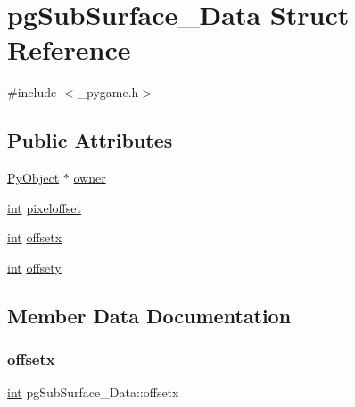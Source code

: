 \hypertarget{structpg_sub_surface___data}{}\section{pg\+Sub\+Surface\+\_\+\+Data Struct Reference}
\label{structpg_sub_surface___data}


{\ttfamily \#include $<$\+\_\+pygame.\+h$>$}

\subsection*{Public Attributes}
\begin{DoxyCompactItemize}
\item 
\mbox{\hyperlink{_python27_2object_8h_aadc84ac7aed2cfa6f20c25f62bf3dac7}{Py\+Object}} $\ast$ \mbox{\hyperlink{structpg_sub_surface___data_aed9538cc59273069e75c874f499173dd}{owner}}
\item 
\mbox{\hyperlink{warnings_8h_a74f207b5aa4ba51c3a2ad59b219a423b}{int}} \mbox{\hyperlink{structpg_sub_surface___data_ada4c14cad4deb253defe94adb214e09b}{pixeloffset}}
\item 
\mbox{\hyperlink{warnings_8h_a74f207b5aa4ba51c3a2ad59b219a423b}{int}} \mbox{\hyperlink{structpg_sub_surface___data_a8cf3503f05cfa0101f3c98fabca01dd6}{offsetx}}
\item 
\mbox{\hyperlink{warnings_8h_a74f207b5aa4ba51c3a2ad59b219a423b}{int}} \mbox{\hyperlink{structpg_sub_surface___data_a53ba10f74abbfbc62305ca4d87c62e63}{offsety}}
\end{DoxyCompactItemize}


\subsection{Member Data Documentation}
\mbox{\label{structpg_sub_surface___data_a8cf3503f05cfa0101f3c98fabca01dd6}} 
\subsubsection{\texorpdfstring{offsetx}{offsetx}}
{\footnotesize\ttfamily \mbox{\hyperlink{warnings_8h_a74f207b5aa4ba51c3a2ad59b219a423b}{int}} pg\+Sub\+Surface\+\_\+\+Data\+::offsetx}

\mbox{\label{structpg_sub_surface___data_a53ba10f74abbfbc62305ca4d87c62e63}} 
